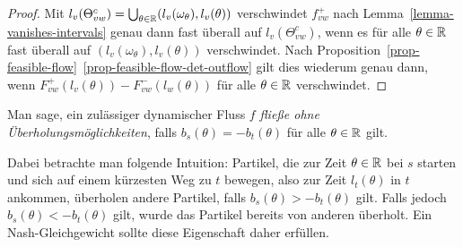 \begin{proof}
	Mit $l_v(\Theta_{vw}^c) = \bigcup_{\theta\in\mathbb{R}}(l_v(\omega_\theta),l_v(\theta))$ verschwindet $f_{vw}^+$ nach Lemma~\ref{lemma-vanishes-intervals} genau dann fast überall auf $l_v(\Theta_{vw}^c)$, wenn es für alle $\theta\in\mathbb{R}$ fast überall auf $(l_v(\omega_\theta),l_v(\theta))$ verschwindet.
	Nach Proposition~\ref{prop-feasible-flow}~\ref{prop-feasible-flow-det-outflow} gilt dies wiederum genau dann, wenn 	$F_{vw}^+(l_v(\theta))-F_{vw}^-(l_w(\theta))$ für alle $\theta\in\mathbb{R}$ verschwindet.
\end{proof}

\begin{definition}
	Man sage, ein zulässiger dynamischer Fluss $f$ \emph{fließe ohne Über\-holungs\-möglichkeiten}, falls $b_s(\theta) = -b_t(\theta)$ für alle $\theta\in\mathbb{R}$ gilt.
\end{definition}

Dabei betrachte man folgende Intuition:
 Partikel, die zur Zeit $\theta\in\mathbb{R}$ bei $s$ starten und sich auf einem kürzesten Weg zu $t$ bewegen, also zur Zeit $l_t(\theta)$ in $t$ ankommen, überholen andere Partikel, falls $b_s(\theta) > -b_t(\theta)$ gilt.
Falls jedoch $b_s(\theta) < - b_t(\theta)$ gilt, wurde das Partikel bereits von anderen überholt.
Ein Nash-Gleichgewicht sollte diese Eigenschaft daher erfüllen.


